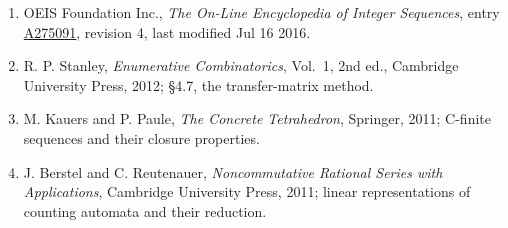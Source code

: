 \documentclass[11pt]{article}
\theoremstyle{definition}
\begin{document}
\begin{enumerate}

\item OEIS Foundation Inc., \emph{The On-Line Encyclopedia of Integer Sequences}, entry \href{https://oeis.org/A275091}{A275091}, revision 4, last modified Jul 16 2016.

\item R. P. Stanley, \emph{Enumerative Combinatorics}, Vol.~1, 2nd ed., Cambridge University Press, 2012; \S4.7, the transfer-matrix method.

\item M. Kauers and P. Paule, \emph{The Concrete Tetrahedron}, Springer, 2011; C-finite sequences and their closure properties.

\item J. Berstel and C. Reutenauer, \emph{Noncommutative Rational Series with Applications}, Cambridge University Press, 2011; linear representations of counting automata and their reduction.

\end{enumerate}
\end{document}
